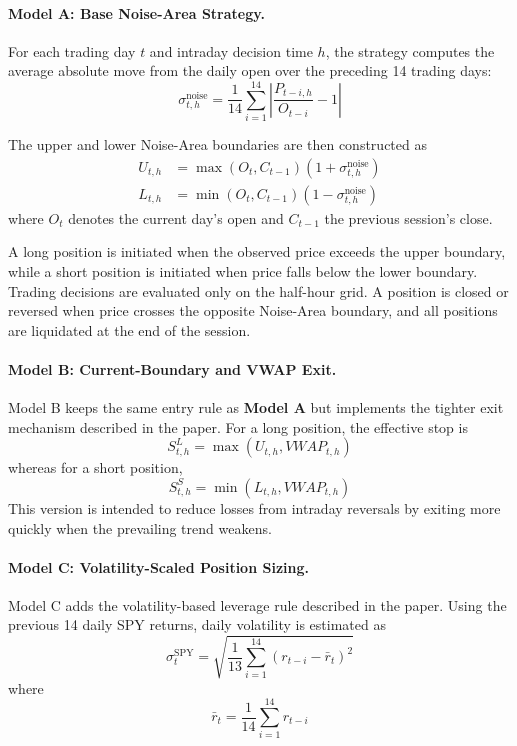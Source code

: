 \documentclass{article}
\begin{document}
\paragraph{Model A: Base Noise-Area Strategy.}
For each trading day $t$ and intraday decision time $h$, the strategy computes the average absolute move from the daily open over the preceding 14 trading days:
\begin{equation}
    \sigma^{\text{noise}}_{t,h}
    =
    \frac{1}{14}
    \sum_{i=1}^{14}
    \left|
    \frac{P_{t-i,h}}{O_{t-i}} - 1
    \right|
\end{equation}

The upper and lower Noise-Area boundaries are then constructed as
\begin{align}
    U_{t,h}
    &=
    \max(O_t,C_{t-1})
    \left(1+\sigma^{\text{noise}}_{t,h}\right)
    \\
    L_{t,h}
    &=
    \min(O_t,C_{t-1})
    \left(1-\sigma^{\text{noise}}_{t,h}\right)
\end{align}
where $O_t$ denotes the current day's open and $C_{t-1}$ the previous session's close.

A long position is initiated when the observed price exceeds the upper boundary, while a short position is initiated when price falls below the lower boundary. Trading decisions are evaluated only on the half-hour grid. A position is closed or reversed when price crosses the opposite Noise-Area boundary, and all positions are liquidated at the end of the session.

\paragraph{Model B: Current-Boundary and VWAP Exit.}
Model B keeps the same entry rule as\textbf{ Model A} but implements the tighter exit mechanism described in the paper. For a long position, the effective stop is
\begin{equation}
    S^{L}_{t,h}
    =
    \max\left(U_{t,h},VWAP_{t,h}\right)
\end{equation}
whereas for a short position,
\begin{equation}
    S^{S}_{t,h}
    =
    \min\left(L_{t,h},VWAP_{t,h}\right)
\end{equation}
This version is intended to reduce losses from intraday reversals by exiting more quickly when the prevailing trend weakens.

\paragraph{Model C: Volatility-Scaled Position Sizing.}
Model C adds the volatility-based leverage rule described in the paper. Using the previous 14 daily SPY returns, daily volatility is estimated as
\begin{equation}
    \sigma^{\text{SPY}}_t
    =
    \sqrt{
    \frac{1}{13}
    \sum_{i=1}^{14}
    \left(r_{t-i}-\bar r_t\right)^2
    }
\end{equation}
where
\begin{equation}
    \bar r_t
    =
    \frac{1}{14}
    \sum_{i=1}^{14} r_{t-i}
\end{equation}
\end{document}

